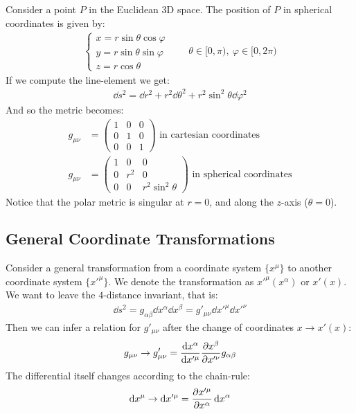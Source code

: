 \documentclass[../template.tex]{subfiles}
\begin{document}
\begin{example}[Spherical coordinates in $d=3$] 
    Consider a point $P$ in the Euclidean $3$D space. The position of $P$ in spherical coordinates is given by:
    \begin{align*}
        \begin{cases}
            x = r \sin \theta \cos \varphi\\
            y = r\sin \theta \sin\varphi\\
            z = r\cos \theta
        \end{cases} \qquad \theta \in [0, \pi), \> \varphi \in [0, 2 \pi)
    \end{align*}  
    If we compute the line-element we get:
    \begin{align*}
        \dd{s}^2 = \dd{r}^2 + r^2 \dd{\theta}^2 + r^2 \sin^2 \theta \dd{\varphi}^2
    \end{align*}
    And so the metric becomes:
    \begin{align*}
        g_{\mu \nu} &= \left(\begin{array}{ccc}
        1 & 0 & 0 \\ 
        0 & 1 & 0 \\ 
        0 & 0 & 1
        \end{array}\right) \text{ in cartesian coordinates}\\
        g_{\mu \nu} &= \left(\begin{array}{ccc}
        1 & 0 & 0 \\ 
        0 & r^2 & 0 \\ 
        0 & 0 & r^2 \sin^2 \theta
        \end{array}\right) \text{ in spherical coordinates}
    \end{align*}
    Notice that the polar metric is singular at $r=0$, and along the $z$-axis ($\theta = 0$).  
\end{example}

\subsection{General Coordinate Transformations}
Consider a general transformation from a coordinate system $\{x^\mu\}$ to another coordinate system $\{x'^\mu\}$. We denote the transformation as $x'^\mu (x^\alpha)$ or $x'(x)$.\\
We want to leave the $4$-distance invariant, that is:
\begin{align*}
    \dd{s}^2 = g_{\alpha \beta} \dd{x}^\alpha \dd{x}^\beta = g'_{\mu \nu} \dd{x'}^\mu \dd{x'}^\nu
\end{align*}     
Then we can infer a relation for $g'_{\mu \nu}$ after the change of coordinates $x \to x'(x)$:
\begin{align*}
    g_{\mu \nu} \to g'_{\mu \nu} = \dv{x^\alpha}{x'^\mu} \pdv{x^\beta}{x'^\nu} g_{\alpha \beta}
\end{align*} 
The differential itself changes according to the chain-rule:
\begin{align*}
    \dd{x^\mu} \to \dd{x'^\mu} = \pdv{x'^\mu}{x^\alpha} \dd{x^\alpha}
\end{align*}
\end{document}
